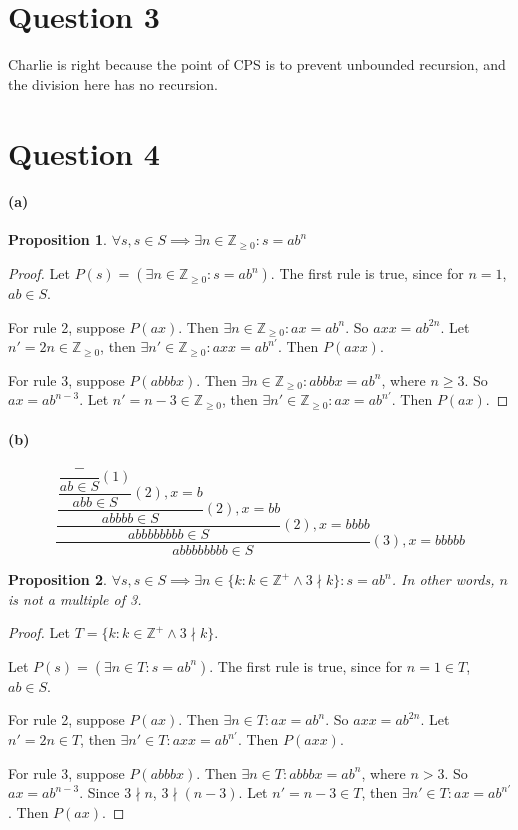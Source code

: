 \documentclass[11pt]{article} %
\newtheorem{prop}{Proposition}
\begin{document}
\section*{Question 3}
Charlie is right because the point of CPS is to prevent unbounded recursion, 
and the division here has no recursion.

\section*{Question 4}
\paragraph{(a)}
\begin{prop}
$\forall s,s\in S \implies \exists n\in\mathbb{Z}_{\geq 0} : s = ab^n$
\end{prop}
\begin{proof}
  Let $P(s)=(\exists n\in\mathbb{Z}_{\geq 0} : s = ab^n)$. The first rule is true, since for $n=1$, $ab\in S$.

  For rule 2, suppose $P(ax)$. Then $\exists n\in\mathbb{Z}_{\geq 0} : ax = ab^n$. So $axx = ab^{2n}$.
  Let $n'=2n\in\mathbb{Z}_{\geq 0}$, then $\exists n'\in\mathbb{Z}_{\geq 0} : axx = ab^{n'}$. Then $P(axx)$.

  For rule 3, suppose $P(abbbx)$. Then $\exists n\in\mathbb{Z}_{\geq 0} : abbbx = ab^n$, where $n\geq3$. 
  So $ax=ab^{n-3}$. 
  Let $n'=n-3\in\mathbb{Z}_{\geq 0}$, then $\exists n'\in\mathbb{Z}_{\geq 0} : ax = ab^{n'}$. Then $P(ax)$.
\end{proof}

\paragraph{(b)}
\[\dfrac{
  \dfrac{
    \dfrac{
      \dfrac{
        \dfrac{-}{ab\in S}(1)
      }{abb\in S} (2), x=b
    }{abbbb \in S} (2), x=bb
  }{abbbbbbbb \in S} (2), x = bbbb
}{abbbbbbbb \in S}(3), x = bbbbb\]


\begin{prop}
$\forall s,s\in S \implies \exists n\in \{k:k\in \mathbb{Z}^+ \wedge 3 \nmid k\} : s = ab^n$.
In other words, $n$ is not a multiple of 3.
\end{prop}

\begin{proof}
  Let $T=\{k:k\in \mathbb{Z}^+ \wedge 3 \nmid k\}$.

  Let $P(s)=(\exists n\in T : s = ab^n)$. The first rule is true, since for $n=1\in T$, $ab\in S$.

  For rule 2, suppose $P(ax)$. Then $\exists n\in T : ax = ab^n$. So $axx = ab^{2n}$.
  Let $n'=2n\in T$, then $\exists n'\in T : axx = ab^{n'}$. Then $P(axx)$.

  For rule 3, suppose $P(abbbx)$. Then $\exists n\in T : abbbx = ab^n$, where $n>3$. 
  So $ax=ab^{n-3}$. Since $3\nmid n$, $3 \nmid (n-3)$.
  Let $n'=n-3\in T$, then $\exists n'\in T : ax = ab^{n'}$. Then $P(ax)$.
\end{proof}
\end{document}
